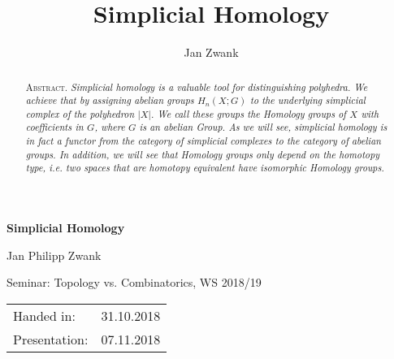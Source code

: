 \documentclass[toc=bib, headinclude]{scrartcl}
\title{Simplicial Homology}
\author{Jan Zwank}
\theoremstyle{plain}
\theoremstyle{definition}
\theoremstyle{remark}
\begin{document}
\begin{titlepage}
	\thispagestyle{empty}
	\begin{center}
	\vspace{2cm}
	{\Huge\bfseries\sffamily Simplicial Homology}
	
	\vspace{1cm}
	
	{\Large Jan Philipp Zwank}
	
	\vspace{0.5cm}
	{Seminar: Topology vs. Combinatorics, WS 2018/19}
	
	\vspace{.25cm}
	\begin{tabular}{ll}
		Handed in:&31.10.2018\\
		Presentation:&07.11.2018
	\end{tabular}
\vspace{0.5cm}
	
	\begin{abstract}
		\textsc{Abstract.}\textit{
		Simplicial homology is a valuable tool for distinguishing polyhedra. We achieve that by assigning abelian groups $H_n(X;G)$ to the underlying simplicial complex of the polyhedron $|X|$. We call these groups the Homology groups of $X$ with coefficients in $G$, where $G$ is an abelian Group. As we will see, simplicial homology is in fact a functor from the category of simplicial complexes to the category of abelian groups. In addition, we will see that Homology groups only depend on the homotopy type, i.e. two spaces that are homotopy equivalent have isomorphic Homology groups.
		}
	\end{abstract}

\clearpage
\end{center}\end{titlepage}
\tableofcontents

\clearpage
\end{document}
